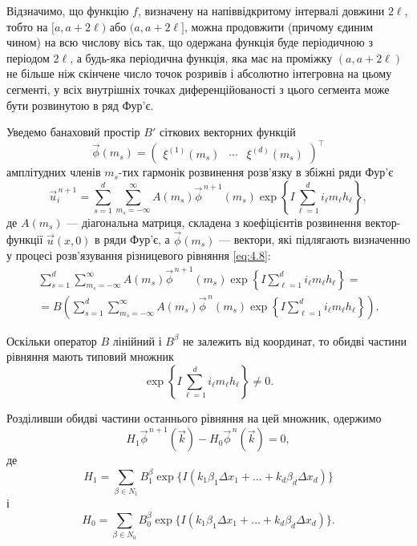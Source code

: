 \begin{proposition}
    Відзначимо, що функцію $f$, визначену на напіввідкритому інтервалі довжини $2 \ell$, тобто на $[a, a + 2 \ell)$ або $(a, a + 2 \ell]$, можна продовжити (причому єдиним чином) на всю числову вісь так, що одержана функція буде періодичною з періодом $2 \ell$, а будь-яка періодична функція, яка має на проміжку  $(a, a + 2 \ell)$ не більше ніж скінчене число точок розривів і абсолютно інтегровна на цьому сегменті, у всіх внутрішніх точках диференційованості з цього сегмента може бути розвинутою в ряд Фур'є.
\end{proposition}

Уведемо банаховий простір $B'$ сіткових векторних функцій 
\begin{equation*}
    \vec \phi (m_s) = \begin{pmatrix} \xi^{(1)}(m_s) & \cdots & \xi^{(d)}(m_s) \end{pmatrix}^\intercal
\end{equation*} 
амплітудних членів $m_s$-тих гармонік розвинення розв'язку в збіжні ряди Фур'є 
\begin{equation}
    \label{eq:4.9}
    \vec u_i^{\,n + 1} = \sum_{s = 1}^d \sum_{m_s = -\infty}^\infty A(m_s) \vec \phi^{\,n + 1}(m_s) \exp \left\{ I \sum_{\ell = 1}^d i_\ell m_\ell h_\ell \right\},
\end{equation}
де $A(m_s)$ --- діагональна матриця, складена з коефіцієнтів розвинення вектор-функції $\vec u(x, 0)$ в ряди Фур'є, а $\vec \phi(m_s)$ --- вектори, які підлягають визначенню у процесі розв'язування різницевого рівняння \eqref{eq:4.8}:
\begin{multline*}
    \sum_{s = 1}^d \sum_{m_s = -\infty}^\infty A(m_s) \vec \phi^{\,n + 1}(m_s) \exp \left\{ I \sum_{\ell = 1}^d i_\ell m_\ell h_\ell \right\} = \\ 
    = B \left( \sum_{s = 1}^d \sum_{m_s = -\infty}^\infty A(m_s) \vec \phi^{\,n}(m_s) \exp \left\{ I \sum_{\ell = 1}^d i_\ell m_\ell h_\ell \right\} \right).
\end{multline*}

Оскільки оператор $B$ лінійний і $B^\beta$ не залежить від координат, то обидві частини рівняння мають типовий множник 
\begin{equation*}
    \exp\left\{I \sum_{\ell = 1}^d i_\ell m_\ell h_\ell \right\} \ne 0.
\end{equation*}

Розділивши обидві частини останнього рівняння на цей множник, одержимо
\begin{equation*}
    H_1 \vec \phi^{\,n + 1} \left( \vec k \right) - H_0 \vec \phi^{\,n} \left( \vec k \right) = 0,    
\end{equation*}
де
\begin{equation*}
    H_1 = \sum_{\beta \in N_1} B_1^\beta \exp\{ I (k_1 \beta_1 \Delta x_1 + \ldots + k_d \beta_d \Delta x_d) \}
\end{equation*}
і
\begin{equation*}
    H_0 = \sum_{\beta \in N_0} B_0^\beta \exp\{ I (k_1 \beta_1 \Delta x_1 + \ldots + k_d \beta_d \Delta x_d) \}.
\end{equation*}
	 
